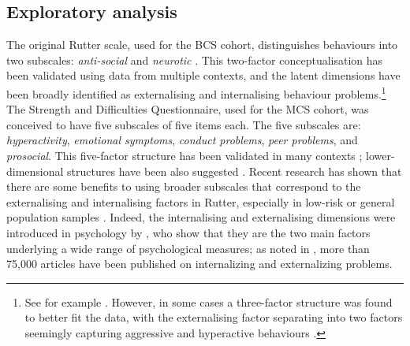 \subsection{Exploratory analysis \label{sec:ea}}

The original Rutter scale, used for the BCS cohort, distinguishes behaviours into two subscales: \emph{anti-social} and \emph{neurotic} \citep{Rutter1970}. This two-factor conceptualisation has been validated using data from multiple contexts, and the latent dimensions have been broadly identified as externalising and internalising behaviour problems.\footnote{See for example \citet{Fowler1979,Venables1983,Tremblay1987,Berglund1999,Klein2009}. However, in some cases a three-factor structure was found to better fit the data, with the externalising factor separating into two factors seemingly capturing aggressive and hyperactive behaviours \citep{Behar1974,McGee1985}.} The Strength and Difficulties Questionnaire, used for the MCS cohort, was conceived to have five subscales of five items each. The five subscales are: \emph{hyperactivity}, \emph{emotional symptoms}, \emph{conduct problems}, \emph{peer problems}, and \emph{prosocial}. This five-factor structure has been validated in many contexts \citep{Stone2010}; lower-dimensional structures have been also suggested \citep{Dickey2004}. Recent research has shown that there are some benefits to using broader subscales that correspond to the externalising and internalising factors in Rutter, especially in low-risk or general population samples \citep{Goodman2010}. Indeed, the internalising and externalising dimensions were introduced in psychology by \citet{Achenbach1966}, who show that they are the two main factors underlying a wide range of psychological measures; as noted in \citet{Achenbach2016}, more than 75,000 articles have been published on internalizing and externalizing problems.

